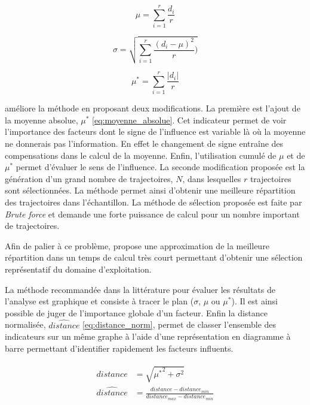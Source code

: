\begin{equation}\label{eq:moyenne}
    \mu = \sum_{i = 1}^{r} \frac{d_{i}}{r}
\end{equation}

\begin{equation}\label{eq:ecart_type}
    \sigma = \sqrt{\sum_{i=1}^{r}\frac{(d_{i} - \mu)^{2}}{r})}
\end{equation}

\begin{equation}\label{eq:moyenne_absolue}
    \mu^{*} = \sum_{i = 1}^{r} \frac{\lvert d_{i} \rvert}{r}
\end{equation}

\cite{Campolongo20071509} améliore la méthode en proposant deux modifications. La première
est l’ajout de la moyenne absolue, $\mu^{*}$ \eqref{eq:moyenne_absolue}. Cet indicateur permet
de voir l’importance des facteurs dont le signe de l’influence est variable là où
la moyenne ne donnerais pas l’information. En effet le changement de signe
entraîne des compensations dans le calcul de la moyenne.
Enfin, l’utilisation cumulé de $\mu$ et de $\mu^{*}$ permet d’évaluer le sens de
l’influence.
La seconde modification proposée est la génération d’un grand nombre de trajectoires, $N$,
dans lesquelles $r$ trajectoires sont sélectionnées. La méthode permet ainsi
d’obtenir une meilleure répartition des trajectoires dans l’échantillon.
La méthode de sélection proposée est faite par \emph{Brute force} et demande une forte puissance
de calcul pour un nombre important de trajectoires.

Afin de palier à ce problème, \cite{Ruano2012103} propose une approximation de
la meilleure répartition dans un temps de calcul très court permettant d’obtenir
une sélection représentatif du domaine d’exploitation.

La méthode recommandée dans la littérature pour évaluer les résultats de l’analyse
est graphique et consiste à tracer le plan ($\sigma$, $\mu$ ou $\mu^{*}$). Il est
ainsi possible de juger de l’importance globale d’un facteur.
Enfin la distance normalisée, $\hat{distance}$ \eqref{eq:distance_norm}, permet
de classer l’ensemble des indicateurs sur un même graphe à l’aide d’une représentation
en diagramme à barre permettant d’identifier rapidement les facteurs influents.

\begin{align}\label{eq:distance_norm}
    \begin{split}
        distance        &= \sqrt{{\mu^{*}}^2 + \sigma^{2}} \\
        \hat{distance}  &=  \frac{distance - distance_{min}}{distance_{max} - distance_{min}}
    \end{split}
\end{align}

